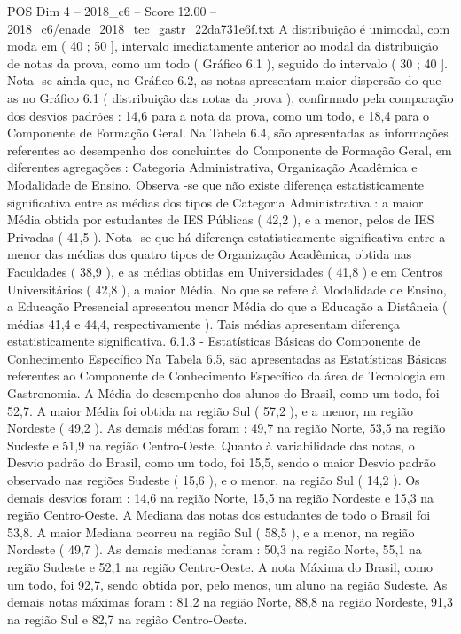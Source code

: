 \begin{textsample}{POS Dim 4 – 2018\_c6 – Score 12.00 – 2018\_c6/enade\_2018\_tec\_gastr\_22da731e6f.txt}
A distribuição é unimodal, com moda em ( 40 ; 50 ], intervalo imediatamente anterior ao modal da distribuição de notas da prova, como um todo ( Gráfico 6.1 ), seguido do intervalo ( 30 ; 40 ].
Nota -se ainda que, no Gráfico 6.2, as notas apresentam maior dispersão do que as no Gráfico 6.1 ( distribuição das notas da prova ), confirmado pela comparação dos desvios padrões : 14,6 para a nota da prova, como um todo, e 18,4 para o Componente de Formação Geral.
Na Tabela 6.4, são apresentadas as informações referentes ao desempenho dos concluintes do Componente de Formação Geral, em diferentes agregações : Categoria Administrativa, Organização Acadêmica e Modalidade de Ensino.
Observa -se que não existe diferença estatisticamente significativa entre as médias dos tipos de Categoria Administrativa : a maior Média obtida por estudantes de IES Públicas ( 42,2 ), e a menor, pelos de IES Privadas ( 41,5 ).
Nota -se que há diferença estatisticamente significativa entre a menor das médias dos quatro tipos de Organização Acadêmica, obtida nas Faculdades ( 38,9 ), e as médias obtidas em Universidades ( 41,8 ) e em Centros Universitários ( 42,8 ), a maior Média.
No que se refere à Modalidade de Ensino, a Educação Presencial apresentou menor Média do que a Educação a Distância ( médias 41,4 e 44,4, respectivamente ).
Tais médias apresentam diferença estatisticamente significativa. 6.1.3 - Estatísticas Básicas do Componente de Conhecimento Específico Na Tabela 6.5, são apresentadas as Estatísticas Básicas referentes ao Componente de Conhecimento Específico da área de Tecnologia em Gastronomia.
A Média do desempenho dos alunos do Brasil, como um todo, foi 52,7.
A maior Média foi obtida na região Sul ( 57,2 ), e a menor, na região Nordeste ( 49,2 ).
As demais médias foram : 49,7 na região Norte, 53,5 na região Sudeste e 51,9 na região Centro-Oeste.
Quanto à variabilidade das notas, o Desvio padrão do Brasil, como um todo, foi 15,5, sendo o maior Desvio padrão observado nas regiões Sudeste ( 15,6 ), e o menor, na região Sul ( 14,2 ).
Os demais desvios foram : 14,6 na região Norte, 15,5 na região Nordeste e 15,3 na região Centro-Oeste.
A Mediana das notas dos estudantes de todo o Brasil foi 53,8.
A maior Mediana ocorreu na região Sul ( 58,5 ), e a menor, na região Nordeste ( 49,7 ).
As demais medianas foram : 50,3 na região Norte, 55,1 na região Sudeste e 52,1 na região Centro-Oeste.
A nota Máxima do Brasil, como um todo, foi 92,7, sendo obtida por, pelo menos, um aluno na região Sudeste.
As demais notas máximas foram : 81,2 na região Norte, 88,8 na região Nordeste, 91,3 na região Sul e 82,7 na região Centro-Oeste.

\end{textsample}
